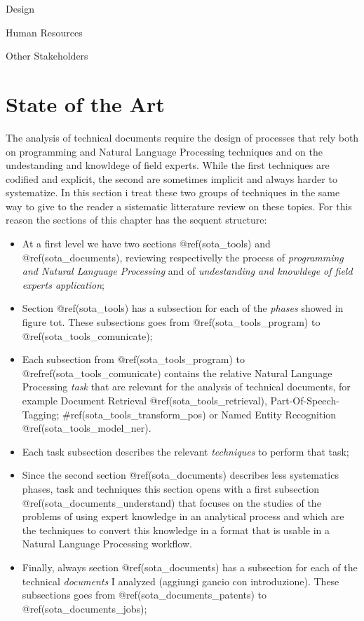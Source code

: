 \documentclass[]{book}
\providecommand{\tightlist}{%
  \setlength{\itemsep}{0pt}\setlength{\parskip}{0pt}}
\theoremstyle{definition}
\theoremstyle{definition}
\theoremstyle{definition}
\theoremstyle{remark}
\begin{document}
Design

Human Resources

Other Stakeholders

\chapter{State of the Art}\label{sota}

The analysis of technical documents require the design of processes that
rely both on programming and Natural Language Processing techniques and
on the undestanding and knowldege of field experts. While the first
techniques are codified and explicit, the second are sometimes implicit
and always harder to systematize. In this section i treat these two
groups of techniques in the same way to give to the reader a sistematic
litterature review on these topics. For this reason the sections of this
chapter has the sequent structure:

\begin{itemize}
\tightlist
\item
  At a first level we have two sections @ref(sota\_tools) and
  @ref(sota\_documents), reviewing respectivelly the process of
  \emph{programming and Natural Language Processing} and of
  \emph{undestanding and knowldege of field experts application};
\item
  Section @ref(sota\_tools) has a subsection for each of the
  \emph{phases} showed in figure tot. These subsections goes from
  @ref(sota\_tools\_program) to @ref(sota\_tools\_comunicate);
\item
  Each subsection from @ref(sota\_tools\_program) to
  @refref(sota\_tools\_comunicate) contains the relative Natural
  Language Processing \emph{task} that are relevant for the analysis of
  technical documents, for example Document Retrieval
  @ref(sota\_tools\_retrieval), Part-Of-Speech-Tagging;
  \#ref(sota\_tools\_transform\_pos) or Named Entity Recognition
  @ref(sota\_tools\_model\_ner).
\item
  Each task subsection describes the relevant \emph{techniques} to
  perform that task;
\item
  Since the second section @ref(sota\_documents) describes less
  systematics phases, task and techniques this section opens with a
  first subsection @ref(sota\_documents\_understand) that focuses on the
  studies of the problems of using expert knowledge in an analytical
  process and which are the techniques to convert this knowledge in a
  format that is usable in a Natural Language Processing workflow.
\item
  Finally, always section @ref(sota\_documents) has a subsection for
  each of the technical \emph{documents} I analyzed (aggiungi gancio con
  introduzione). These subsections goes from
  @ref(sota\_documents\_patents) to @ref(sota\_documents\_jobs);
\end{itemize}
\end{document}
